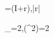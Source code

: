 \rho=\left(I+\mathbf r\cdot\vec{\sigma}\right),\qquad |\mathbf r|

\lambda_\pm=2,\qquad {}(\rho^2)=2
